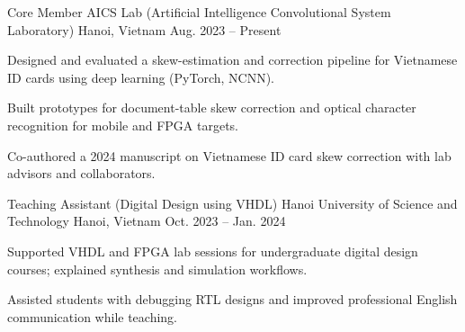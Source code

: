 
\begin{cventries}
  \cventry
  {Core Member} %
  {AICS Lab (Artificial Intelligence Convolutional System Laboratory)} %
  {Hanoi, Vietnam} %
  {Aug. 2023 -- Present} %
  {
    \begin{cvitems} %
      \item {Designed and evaluated a skew-estimation and correction pipeline for Vietnamese ID cards using deep learning (PyTorch, NCNN).}
      \item {Built prototypes for document-table skew correction and optical character recognition for mobile and FPGA targets.}
      \item {Co-authored a 2024 manuscript on Vietnamese ID card skew correction with lab advisors and collaborators.}
    \end{cvitems}
  }

  \cventry
  {Teaching Assistant (Digital Design using VHDL)} %
  {Hanoi University of Science and Technology} %
  {Hanoi, Vietnam} %
  {Oct. 2023 -- Jan. 2024} %
  {
    \begin{cvitems} %
      \item {Supported VHDL and FPGA lab sessions for undergraduate digital design courses; explained synthesis and simulation workflows.}
      \item {Assisted students with debugging RTL designs and improved professional English communication while teaching.}
    \end{cvitems}
  }
\end{cventries}
